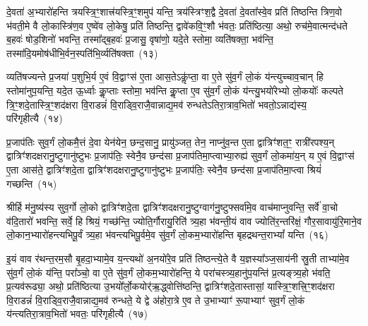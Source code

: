 दे॒वता॑ अ॒भ्यारो॑हन्ति त्रयस्त्रि॒ꣳ॒शात्त्र॑यस्त्रि॒ꣳ॒शमुप॑ यन्ति॒ त्रय॑स्त्रिꣳश॒द्वै दे॒वता॑ दे॒वता᳚स्वे॒व प्रति॑ तिष्ठन्ति त्रिण॒वो भ॑वती॒मे वै लो॒कास्त्रि॑ण॒व ए॒ष्वे॑व लो॒केषु॒ प्रति॑ तिष्ठन्ति॒ द्वावे॑कवि॒ꣳ॒शौ भ॑वतः॒ प्रति॑ष्ठित्या॒ अथो॒ रुच॑मे॒वात्मन्द॑धते ब॒हवः॑ षोड॒शिनो॑ भवन्ति॒ तस्मा᳚द्ब॒हवः॑ प्र॒जासु॒ वृषा॑णो॒ यदे॒ते स्तोमा॒ व्यति॑षक्ता॒ भव॑न्ति॒ तस्मा॑दि॒यमोष॑धीभि॒र्वन॒स्पति॑भि॒र्व्यति॑षक्ता~(१३)

व्यति॑षज्यन्ते प्र॒जया॑ प॒शुभि॒र्य ए॒वं वि॒द्वाꣳस॑ ए॒ता आस॒ते\-ऽकॢ॑प्ता॒ वा ए॒ते सु॑व॒र्गं लो॒कं य॑न्त्युच्चाव॒चान् हि स्तोमा॑नुप॒यन्ति॒ यदे॒त ऊ॒र्ध्वाः कॢ॒प्ताः स्तोमा॒ भव॑न्ति कॢ॒प्ता ए॒व सु॑व॒र्गं लो॒कं य॑न्त्यु॒भयो॑रेभ्यो लो॒कयोः᳚ कल्पते त्रि॒ꣳ॒शदे॒तास्त्रि॒ꣳ॒शद॑क्षरा वि॒राडन्नं॑ वि॒राड्वि॒राजै॒वान्नाद्य॒मव॑ रुन्धते\-ऽतिरा॒त्राव॒भितो॑ भवतो॒\-ऽन्नाद्य॑स्य॒ परि॑गृहीत्यै~(१४)

{\anuvakamend[{ओष॑धीः संवथ्स॒र ए॒वाव॑ प्रति॒ष्ठाय॒ व्यति॑ष॒क्तैका॒न्नप॑ञ्चा॒शच्च॑}]}%

प्र॒जाप॑तिः सुव॒र्गं लो॒कमै॒त्तं दे॒वा येन॑येन॒ छन्द॒सानु॒ प्रायु॑ञ्जत॒ तेन॒ नाप्नु॑व॒न्त ए॒ता द्वात्रिꣳ॑शत॒ꣳ॒ रात्री॑रपश्य॒न् द्वात्रिꣳ॑शदक्षरानु॒ष्टुगानु॑ष्टुभः प्र॒जाप॑तिः॒ स्वेनै॒व छन्द॑सा प्र॒जाप॑तिमा॒प्त्वाभ्या॒रुह्य॑ सुव॒र्गं लो॒कमा॑य॒न् य ए॒वं वि॒द्वाꣳस॑ ए॒ता आस॑ते॒ द्वात्रिꣳ॑शदे॒ता द्वात्रिꣳ॑शदक्षरानु॒ष्टुगानु॑ष्टुभः प्र॒जाप॑तिः॒ स्वेनै॒व छन्द॑सा प्र॒जाप॑तिमा॒प्त्वा श्रियं॑ गच्छन्ति~(१५)

श्रीर्\mbox{}हि म॑नु॒ष्य॑स्य सुव॒र्गो लो॒को द्वात्रिꣳ॑शदे॒ता द्वात्रिꣳ॑शदक्षरानु॒ष्टुग्वाग॑नु॒ष्टुफ्सर्वा॑मे॒व वाच॑माप्नुवन्ति॒ सर्वे॑ वा॒चो व॑दि॒तारो॑ भवन्ति॒ सर्वे॒ हि श्रियं॒ गच्छ॑न्ति॒ ज्योति॒र्गौरायु॒रिति॑ त्र्य॒हा भ॑वन्ती॒यं वाव ज्योति॑र॒न्तरि॑क्षं॒ गौर॒सावायु॑\-रि॒माने॒व लो॒कान॒भ्यारो॑हन्त्यभिपू॒र्वं त्र्य॒हा भ॑वन्त्यभिपू॒र्वमे॒व सु॑व॒र्गं लो॒कम॒भ्यारो॑हन्ति बृहद्रथन्त॒रा\-भ्यां᳚ यन्ति~(१६)

इ॒यं वाव र॑थन्त॒रम॒सौ बृ॒हदा॒भ्यामे॒व य॒न्त्यथो॑ अ॒नयो॑रे॒व प्रति॑ तिष्ठन्त्ये॒ते वै य॒ज्ञस्या᳚ञ्ज॒साय॑नी स्रु॒ती ताभ्या॑मे॒व सु॑व॒र्गं लो॒कं य॑न्ति॒ परा᳚ञ्चो॒ वा ए॒ते सु॑व॒र्गं लो॒कम॒भ्यारो॑हन्ति॒ ये परा॑चस्त्र्य॒हानु॑प॒यन्ति॑ प्र॒त्यङ्त्र्य॒हो भ॑वति॒ प्र॒त्यव॑रूढ्या॒ अथो॒ प्रति॑ष्ठित्या उ॒भयो᳚र्लो॒कयोर्\mbox{}॑ऋ॒द्ध्वोत्ति॑ष्ठन्ति॒ द्वात्रिꣳ॑शदे॒तास्तासां॒ यास्त्रि॒ꣳ॒शत्त्रि॒ꣳ॒शद॑क्षरा वि॒राडन्नं॑ वि॒राड्वि॒राजै॒वान्नाद्य॒मव॑ रुन्धते॒ ये द्वे अ॑होरा॒त्रे ए॒व ते उ॒भाभ्याꣳ॑ रू॒पाभ्याꣳ॑ सुव॒र्गं लो॒कं य॑न्त्यतिरा॒त्राव॒भितो॑ भवतः॒ परि॑गृहीत्यै~(१७)

{\anuvakamend[{ग॒च्छ॒न्ति॒ य॒न्ति॒ त्रि॒ꣳ॒शद॑क्षरा॒ द्वाविꣳ॑शतिश्च}]}%

